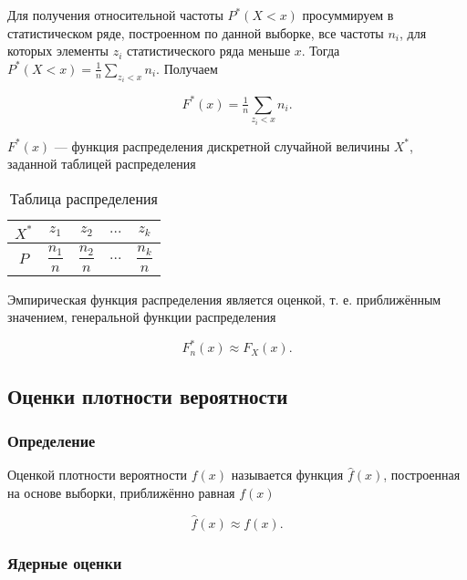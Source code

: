 \documentclass[report.tex]{subfiles}
\begin{document}
Для получения относительной частоты $P^*(X < x)$ просуммируем в статистическом ряде, построенном по данной выборке, все частоты $n_i$, для которых элементы $z_i$ статистического ряда меньше $x$. Тогда $P^*(X < x) = \tfrac{1}{n}\sum\limits_{z_i < x}n_i$. Получаем

\begin{equation}
    F^*(x) = \tfrac{1}{n}\sum\limits_{z_i < x}n_i.
\end{equation}

$F^*(x)$ --- функция распределения дискретной случайной величины $X^*$, заданной таблицей распределения

\begin{table}[h!]
\begin{center}
\begin{tabular}{|c|c|c|c|c|}
\hline
$X^*$ & $z_1$ & $z_2$ & $...$ & $z_k$ \\
\hline
$P$ & $\dfrac{n_1}{n}$ & $\dfrac{n_2}{n}$ & $...$ & $\dfrac{n_k}{n}$ \\
\hline
\end{tabular}
\end{center}
\caption{Таблица распределения}
\end{table}

Эмпирическая функция распределения является оценкой, т. е. приближённым значением, генеральной функции распределения

\begin{equation}
    F_n^*(x) \approx F_X(x).
\end{equation}

\subsection{Оценки плотности вероятности}

\subsubsection{Определение}

Оценкой плотности вероятности $f(x)$ называется функция $\widehat{f}(x)$, построенная на основе выборки, приближённо равная $f(x)$

\begin{equation}
    \widehat{f}(x) \approx f(x).
\end{equation}

\subsubsection{Ядерные оценки}
\end{document}

